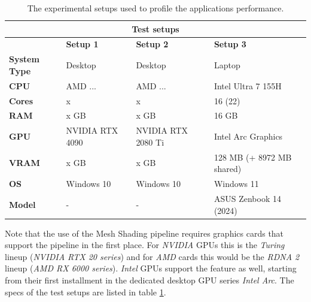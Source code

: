 \begin{table}[h]
    \begin{tabular}{|llll|}
        \hline
        \multicolumn{4}{|c|}{\textbf{Test setups}}                                                                                                               \\ \hline
        \multicolumn{1}{|l|}{}                     & \multicolumn{1}{l|}{\textbf{Setup 1}} & \multicolumn{1}{l|}{\textbf{Setup 2}}   & \textbf{Setup 3}          \\ \hline
        \multicolumn{1}{|l|}{\textbf{System Type}} & \multicolumn{1}{l|}{Desktop}          & \multicolumn{1}{l|}{Desktop}            & Laptop                    \\
        \multicolumn{1}{|l|}{\textbf{CPU}}         & \multicolumn{1}{l|}{AMD ...}          & \multicolumn{1}{l|}{AMD ...}            & Intel Ultra 7 155H        \\
        \multicolumn{1}{|l|}{\textbf{Cores}}       & \multicolumn{1}{l|}{x}                & \multicolumn{1}{l|}{x}                  & 16 (22)                   \\
        \multicolumn{1}{|l|}{\textbf{RAM}}         & \multicolumn{1}{l|}{x GB}             & \multicolumn{1}{l|}{x GB}               & 16 GB                     \\
        \multicolumn{1}{|l|}{\textbf{GPU}}         & \multicolumn{1}{l|}{NVIDIA RTX 4090}  & \multicolumn{1}{l|}{NVIDIA RTX 2080 Ti} & Intel Arc Graphics        \\
        \multicolumn{1}{|l|}{\textbf{VRAM}}        & \multicolumn{1}{l|}{x GB}             & \multicolumn{1}{l|}{x GB}               & 128 MB (+ 8972 MB shared) \\
        \multicolumn{1}{|l|}{\textbf{OS}}          & \multicolumn{1}{l|}{Windows 10}       & \multicolumn{1}{l|}{Windows 10}         & Windows 11                \\
        \multicolumn{1}{|l|}{\textbf{Model}}       & \multicolumn{1}{l|}{-}                & \multicolumn{1}{l|}{-}                  & ASUS Zenbook 14 (2024)    \\ \hline
    \end{tabular}
    \caption{The experimental setups used to profile the applications performance.}
    \label{tbl:hardware-setup}
\end{table}

\noindent
Note that the use of the Mesh Shading pipeline requires graphics cards that support the pipeline in the first place. 
For \emph{NVIDIA} \ac{GPU}s this is the \emph{Turing} lineup (\emph{NVIDIA RTX 20 series}) and for \emph{AMD} cards 
this would be the \emph{RDNA 2} lineup (\emph{AMD RX 6000 series}). \emph{Intel} \ac{GPU}s support the feature as 
well, starting from their first installment in the dedicated desktop \ac{GPU} series \emph{Intel Arc}. The specs of 
the test setups are listed in table \ref{tbl:hardware-setup}. \\



